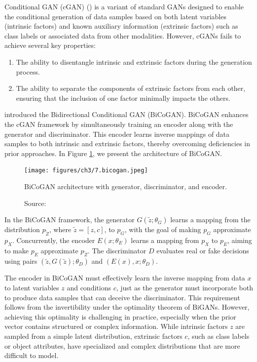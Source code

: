 Conditional GAN (cGAN) (\cite{mirza2014})
is a variant of standard GANs designed to enable the
conditional generation of data samples based on both latent variables
(intrinsic factors) and known auxiliary information (extrinsic factors)
such as class labels or associated data from other modalities.
However, cGANs fails to achieve several key properties:

\begin{enumerate}
    \item The ability to disentangle intrinsic and extrinsic
    factors during the generation process.
    \item The ability to separate the components of extrinsic
    factors from each other, ensuring that the inclusion of one
    factor minimally impacts the others.
\end{enumerate}

\cite{jaiswal2018} introduced the Bidirectional Conditional GAN (BiCoGAN).
BiCoGAN enhances the cGAN framework by simultaneously training an encoder
along with the generator and discriminator.
This encoder learns inverse mappings of data samples to both intrinsic
and extrinsic factors, thereby overcoming deficiencies in prior approaches.
In Figure \ref{fig:bicogan}, we present the architecture of BiCoGAN.

\begin{figure}[h]
    \centering
    \texttt{[image: figures/ch3/7.bicogan.jpeg]}
    \caption{BiCoGAN architecture with generator, discriminator, and encoder.}
    \vspace{-10px}
    \caption*{\scriptsize{Source: \cite{jaiswal2018}}}
    \label{fig:bicogan}
\end{figure}

In the BiCoGAN framework, the generator
\( G(\tilde{z}; \theta_G) \) learns a mapping from the distribution
\( p_{\tilde{Z}} \), where \( \tilde{z} = [z, c] \), to \( p_G \),
with the goal of making \( p_G \) approximate \( p_X \). Concurrently,
the encoder \( E(x; \theta_E) \) learns a mapping from \( p_X \) to \( p_E \),
aiming to make \( p_E \) approximate \( p_{\tilde{Z}} \). The discriminator
\( D \) evaluates real or fake decisions using pairs
\( (\tilde{z}, G(\tilde{z}); \theta_D) \) and \( (E(x), x; \theta_D) \).

The encoder in BiCoGAN must effectively learn the inverse mapping from data
\( x \) to latent variables \( z \) and conditions \( c \),
just as the generator must incorporate both to produce data samples
that can deceive the discriminator. This requirement follows from the
invertibility under the optimality theorem of BiGANs.
However, achieving this optimality is challenging in practice,
especially when the prior vector contains structured or complex information.
While intrinsic factors \( z \) are sampled from a simple latent distribution,
extrinsic factors \( c \), such as class labels or object attributes,
have specialized and complex distributions that are more difficult to model.

